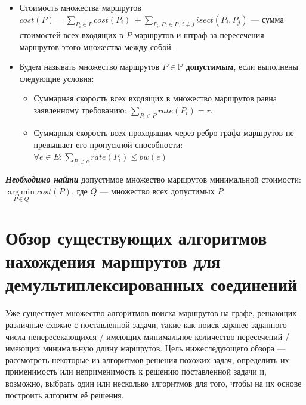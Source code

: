 \documentclass[a4paper]{article}
\DeclareMathOperator*{\argmin}{arg\,min}
\begin{document}
\begin{itemize}
\item Стоимость множества маршрутов $cost(P) = \sum\limits_{P_i\in P} cost(P_i)\ + \sum\limits_{P_i, P_j \in P, \ i \ne j} isect(P_i, P_j)$ --- сумма стоимостей всех входящих в $P$ маршрутов и штраф за пересечения маршрутов этого множества между собой.

\item Будем называть множество маршрутов $P\in \mathbb{P}$ \textbf{допустимым}, если выполнены следующие условия:
\begin{itemize}
\item Суммарная скорость всех входящих в множество маршрутов равна заявленному требованию: $\sum\limits_{P_i\in P} rate(P_i) = r$.
\item Суммарная скорость всех проходящих через ребро графа маршрутов не превышает его пропускной способности: $\forall e \in E: \sum\limits_{P_i \ni e} rate(P_i) \le bw(e)$
\end{itemize}
\end{itemize}

\textit{\textbf{Необходимо найти}} допустимое множество маршрутов минимальной стоимости: $\argmin\limits_{P\in Q} cost(P)$, где $Q$ --- множество всех допустимых $P$.

\newpage
\section{Обзор существующих алгоритмов нахождения маршрутов для демультиплексированных соединений}
Уже существует множество алгоритмов поиска маршрутов на графе, решающих различные схожие с поставленной задачи, такие как поиск заранее заданного числа непересекающихся / имеющих минимальное количество пересечений / имеющих минимальную длину маршрутов. Цель нижеследующего обзора --- рассмотреть некоторые из алгоритмов решения похожих задач, определить их применимость или неприменимость к решению поставленной задачи и, возможно, выбрать один или несколько алгоритмов для того, чтобы на их основе построить алгоритм её решения.
\end{document}
